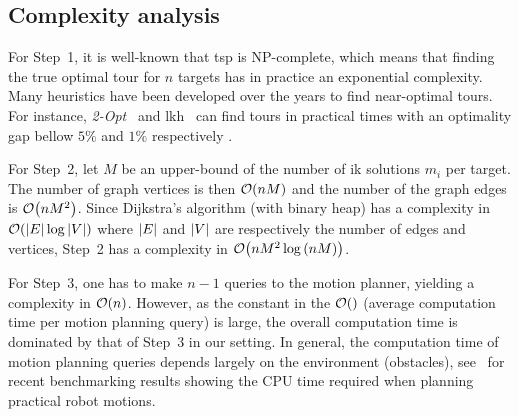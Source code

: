 \subsection{Complexity analysis}

For Step~1, it is well-known that \ac{tsp} is NP-complete, which means that
finding the true optimal tour for $n$ targets has in practice an exponential
complexity. Many heuristics have been developed over the years to find
near-optimal tours. For instance, \textit{2-Opt}~\cite{Croes1958} and
\ac{lkh}~\cite{Helsgaun2000} can find tours in practical times with an
optimality gap bellow $5\%$ and $1\%$ respectively \cite{Applegate2011}.

For Step~2, let $M$ be an upper-bound of the number of \ac{ik} solutions $m_i$
per target. The number of graph vertices is then $\order{nM}$ and the number of
the graph edges is $\order{nM^2}$. Since Dijkstra's algorithm (with binary heap)
has a complexity in $\order{\abs{E}\log\abs{V}}$ where $\abs{E}$ and $\abs{V}$
are respectively the number of edges and vertices, Step~2 has a complexity in
$\order{nM^2\log{\qty(nM)}}$.

For Step~3, one has to make $n-1$ queries to the motion planner, yielding a
complexity in $\order{n}$. However, as the constant in the $\order{}$ (average
computation time per motion planning query) is large, the overall computation
time is dominated by that of Step~3 in our setting. In general, the computation
time of motion planning queries depends largely on the environment (obstacles),
see~\cite{Sucan2012,Meijer2017} for recent benchmarking results showing the CPU
time required when planning practical robot motions.

